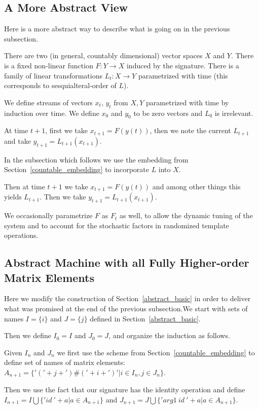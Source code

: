 \documentclass[withtimes]{easychair}
\begin{document}
\subsection{A More Abstract View}

Here is a more abstract way to describe what is going on in the previous subsection.

There are two (in general, countably dimensional) vector spaces $X$ and $Y$. There is
a fixed non-linear function $F : Y \rightarrow X$ induced by the signature. There is
a family of linear transformations $L_t: X \rightarrow Y$ parametrized with time
(this corresponds to sesquialteral-order of $L$).

We define streams of vectors $x_t$, $y_t$ from $X, Y$ parametrized with time by induction over time.
We define $x_0$ and $y_0$ to be zero vectors and $L_0$ is irrelevant.

At time $t+1$, first we take $x_{t+1} = F(y(t))$, then we note the current
$L_{t+1}$ and take $y_{t+1} = L_{t+1} (x_{t+1})$.

In the subsection which follows we use the embedding from Section~\ref{countable_embedding}
to incorporate $L$ into $X$.

Then at time $t+1$ we take $x_{t+1} = F(y(t))$ and among other things this yields $L_{t+1}$.
Then we take $y_{t+1} = L_{t+1} (x_{t+1})$. 

We occasionally parametrize $F$ as $F_t$ as well, to allow the dynamic tuning of the system
and to account for the stochastic factors in randomized template operations.

\subsection{Abstract Machine with all Fully Higher-order Matrix Elements}\label{fully_higher_order}

Here we modify the construction of Section~\ref{abstract_basic} in order to deliver what
was promised at the end of the previous subsection.We start with sets of names $I= \{i\}$ and
$J=\{j\}$ defined in  Section~\ref{abstract_basic}.

Then we define $I_0 = I$ and $J_0 = J$, and organize the induction as follows.

Given $I_n$ and $J_n$ we first use the scheme from Section~\ref{countable_embedding} to define
set of names of matrix elements: $A_{n+1} = \{'('+j+')\#('+i+')' | i \in I_n, j \in J_n\}$.

Then we use the fact that our signature has the identity operation and define
$I_{n+1} = I \bigcup \{'id\ '+ a | a \in A_{n+1}\}$ and $J_{n+1} = J \bigcup \{'arg1\ id\ '+ a | a \in A_{n+1}\}$.
\end{document}
